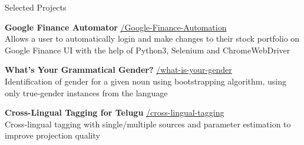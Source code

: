
\begin{rSection}{\faGithub \hspace{0.5mm} Selected Projects}

    {\textbf{Google Finance Automator}} \hfill{\href{https://github.com/Akshayanti/Google-Finance-Automation}{\faGithub/Google-Finance-Automation}}\\
        Allows a user to automatically login and make changes to their stock portfolio on Google Finance UI with the help of Python3, Selenium and ChromeWebDriver

    {\textbf{What's Your Grammatical Gender?}} \hfill {\href{https://github.com/Akshayanti/what-is-your-gender}{\faGithub/what-is-your-gender}}\\
        Identification of gender for a given noun using bootstrapping algorithm, using only true-gender instances from the language

    {\textbf{Cross-Lingual Tagging for Telugu}} \hfill
    \href{https://github.com/Akshayanti/cross-lingual-tagging}{\faGithub/cross-lingual-tagging}\\
        Cross-lingual tagging with single/multiple sources and parameter estimation to improve projection quality

\end{rSection}